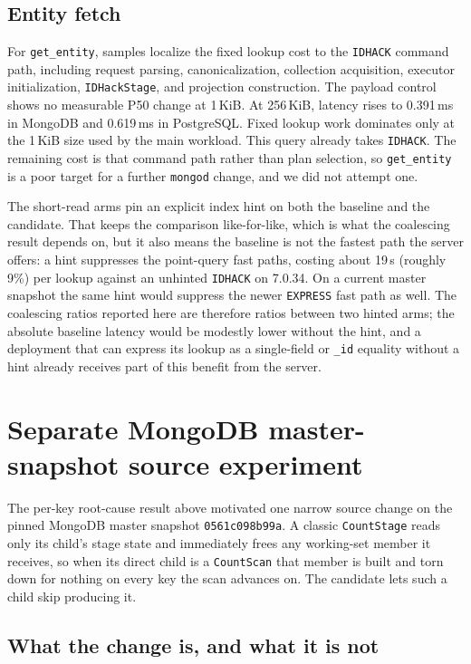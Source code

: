 \documentclass[10pt]{article}
\newcommand{\code}[1]{\texttt{#1}}
\begin{document}
\subsection{Entity fetch}

For \code{get\_entity}, samples localize the fixed lookup cost to the
\code{IDHACK} command path, including
request parsing, canonicalization, collection acquisition, executor
initialization, \code{IDHackStage}, and projection construction. The payload
control shows no measurable P50 change at 1\,KiB. At 256\,KiB, latency rises
to 0.391\,ms in MongoDB and 0.619\,ms in PostgreSQL. Fixed lookup work
dominates only at the 1\,KiB size used by the main workload.
This query already takes \code{IDHACK}. The remaining cost is that command
path rather than plan selection, so \code{get\_entity} is a poor target for
a further \code{mongod} change, and we did not attempt one.

The short-read arms pin an explicit index hint on both the baseline and the
candidate. That keeps the comparison like-for-like, which is what the coalescing
result depends on, but it also means the baseline is not the fastest path the
server offers: a hint suppresses the point-query fast paths, costing about
19\,\textmu s (roughly 9\%) per lookup against an unhinted \code{IDHACK} on
7.0.34. On a current master snapshot the same hint would suppress the newer
\code{EXPRESS} fast path as well. The coalescing ratios reported here are
therefore ratios between two hinted arms; the absolute baseline latency would be
modestly lower without the hint, and a deployment that can express its lookup as
a single-field or \code{\_id} equality without a hint already receives part of
this benefit from the server.

\section{Separate MongoDB master-snapshot source experiment}
\label{sec:master-countscan}

The per-key root-cause result above motivated one narrow source change on the
pinned MongoDB master snapshot \code{0561c098b99a}. A classic \code{CountStage}
reads only its child's stage state and immediately frees any working-set member
it receives, so when its direct child is a \code{CountScan} that member is built
and torn down for nothing on every key the scan advances on. The candidate lets
such a child skip producing it.

\subsection{What the change is, and what it is not}
\end{document}
